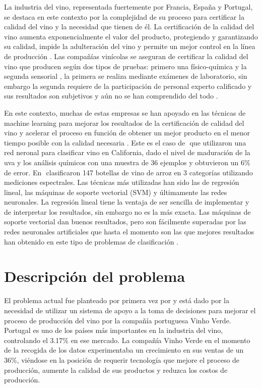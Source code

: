 \documentclass[runningheads]{llncs}
\begin{document}
La industria del vino, representada fuertemente por Francia, Espa\~{n}a y Portugal, se destaca en este contexto por la complejidad de su proceso para certificar la calidad del vino y la necesidad que tienen de {\'e}l. La certificaci{\'o}n de la calidad del vino aumenta exponencialmente el valor del producto, protegiendo y garantizando su calidad, impide la adulteraci{\'o}n del vino y permite un mejor control en la l{\'i}nea de producción \cite{er2016classification}⁠. Las compa\~{n}{\'i}as vin{\'i}colas se aseguran de certificar la calidad del vino que producen seg{\'u}n dos tipos de pruebas: primero una f{\'i}sico-qu{\'i}mica y la segunda sensorial \cite{radosavljevicdata}⁠, la primera se realiza mediante ex{\'a}menes de laboratorio, sin embargo la segunda requiere de la participaci{\'o}n de personal experto calificado y sus resultados son subjetivos y a{\'u}n no se han comprendido del todo \cite{ye2020new}⁠.

En este contexto, muchas de estas empresas se han apoyado en las t{\'e}cnicas de machine learning para mejorar los resultados de la certificaci{\'o}n de calidad del vino y acelerar el proceso en funci{\'o}n de obtener un mejor producto en el menor tiempo posible con la calidad necesaria \cite{ramazanrole}⁠. Este es el caso de \cite{vlassides2001using}⁠ que utilizaron una red neronal para clasificar vino en California, dado el nivel de maduraci{\'o}n de la uva y los an{\'a}lisis qu{\'i}micos con una muestra de 36 ejemplos y obtuvieron un 6\% de error. En \cite{yu2008prediction}⁠ clasificaron 147 botellas de vino de arroz en 3 categor{\'i}as utilizando mediciones espectrales. Las t{\'e}cnicas m{\'a}s utilizadas han sido las de regresi{\'o}n lineal, las m{\'a}quinas de soporte vectorial (SVM) y {\'u}ltimamente las redes neuronales. La regresi{\'o}n lineal tiene la ventaja de ser sencilla de implementar y de interpretar los resultados, sin embargo no es la m{\'a}s exacta. Las m{\'a}quinas de soporte vectorial dan buenos resultados, pero son f{\'a}cilmente superadas por las redes neuronales artificiales que hasta el momento son las que mejores resultados han obtenido en este tipo de problemas de clasificaci{\'o}n \cite{er2016classification}⁠. 

\section{Descripci{\'o}n del problema}
El problema actual fue planteado por primera vez por \cite{cortez2009modeling} ⁠y est{\'a} dado por la necesidad de utilizar un sistema de apoyo a la toma de decisiones para mejorar el proceso de producci{\'o}n del vino por la compa\~{n}{\'i}a portuguesa Vinho Verde. Portugal es uno de los pa{\'i}ses m{\'a}s importantes en la industria del vino, controlando el 3.17\% en ese mercado. La compa\~{n}{\'i}a Vinho Verde en el momento de la recogida de los datos experimentaba un crecimiento en sus ventas de un 36\%, vi{\'e}ndose en la posici{\'o}n de requerir tecnolog{\'i}a que mejore el proceso de producci{\'o}n, aumente la calidad de sus productos y reduzca los costos de producción.
\end{document}

